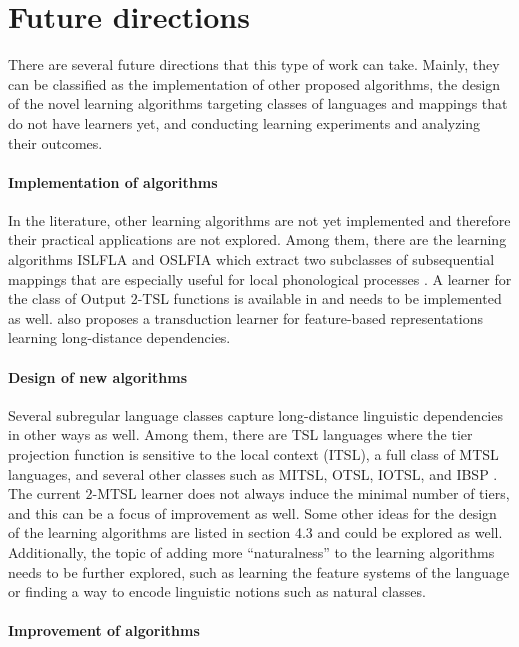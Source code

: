 \section{Future directions}


There are several future directions that this type of work can take.
Mainly, they can be classified as the implementation of other proposed algorithms, the design of the novel learning algorithms targeting classes of languages and mappings that do not have learners yet, and conducting learning experiments and analyzing their outcomes.

\paragraph{Implementation of algorithms}
In the literature, other learning algorithms are not yet implemented and therefore their practical applications are not explored.
Among them, there are the learning algorithms ISLFLA and OSLFIA which extract two subclasses of subsequential mappings that are especially useful for local phonological processes \citep{ChandleeEtAl2014,ChandleeEtAl2015}.
A learner for the class of Output $2$-TSL functions is available in \citep{BurnessMcMullin2019} and needs to be implemented as well.
\cite{chandlee-etal-2019-learning} also proposes a transduction learner for feature-based representations learning long-distance dependencies.

\paragraph{Design of new algorithms}
Several subregular language classes capture long-distance linguistic dependencies in other ways as well.
Among them, there are TSL languages where the tier projection function is sensitive to the local context (ITSL), a full class of MTSL languages, and several other classes such as MITSL, OTSL, IOTSL, and IBSP \citep{Graf17Phonology,DeSantoGraf19FG}.
The current $2$-MTSL learner does not always induce the minimal number of tiers, and this can be a focus of improvement as well.
Some other ideas for the design of the learning algorithms are listed in section 4.3 and could be explored as well.
Additionally, the topic of adding more ``naturalness'' to the learning algorithms needs to be further explored, such as learning the feature systems of the language or finding a way to encode linguistic notions such as natural classes.


\paragraph{Improvement of algorithms}

